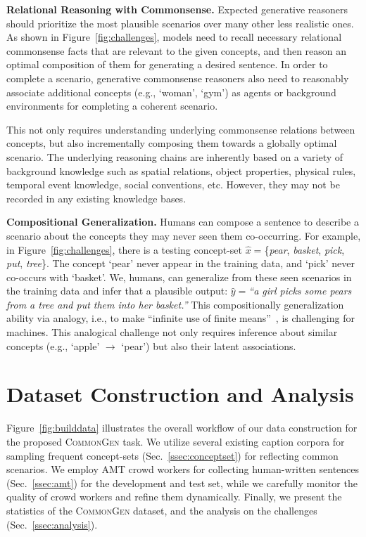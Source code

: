 \documentclass[11pt,a4paper]{article}
\begin{document}
	\smallskip
	\noindent
	\textbf{Relational Reasoning with Commonsense.}
	Expected generative reasoners should prioritize the most plausible scenarios over many other less realistic ones.
	As shown in Figure~\ref{fig:challenges},
	models need to recall necessary relational commonsense facts that are relevant to the given concepts, and then reason an optimal composition of them for generating a desired sentence.
In order to complete a scenario,  generative commonsense reasoners also need to reasonably associate additional concepts (e.g., `woman',  `gym') as agents or background environments for completing a coherent scenario. 


	This not only requires understanding underlying commonsense relations between concepts, 
	but also incrementally composing them towards a globally optimal scenario.
	The underlying reasoning chains are  
	inherently based on a variety of background knowledge such as spatial relations,  object properties, physical rules, temporal event knowledge, social conventions, etc. 
	However, they may not be recorded in any existing knowledge bases.




	
	\smallskip
	\noindent
	\textbf{Compositional Generalization.}
Humans can compose a sentence to describe a scenario about the concepts they may never seen them co-occurring.
	For example, in Figure~\ref{fig:challenges}, there is a testing concept-set $\hat{x}=$\{\textit{pear}, \textit{basket}, \textit{pick}, \textit{put}, \textit{tree}\}.
	The concept `pear' never appear in the training data, and `pick' never co-occurs with `basket'. 
We, humans, can generalize from these seen scenarios in the training data and infer that a plausible output: $\hat{y}=$\textit{``a girl picks some pears from a tree and put them into her basket.''} 
This compositionally generalization ability via analogy, i.e., to make ``infinite use of finite means''~\cite{chomsky1965aspects}, is challenging for machines.
This analogical challenge not only requires inference about similar concepts (e.g., `apple' $\rightarrow$ `pear') but also their latent associations.



	 	
	\section{Dataset Construction and Analysis}
	\label{sec:dataset}
Figure~\ref{fig:builddata}
illustrates the overall workflow of our data construction for the proposed \textsc{CommonGen} task.	
We utilize several existing caption corpora for sampling frequent concept-sets (Sec.~\ref{ssec:conceptset}) for reflecting common scenarios.
	We employ AMT crowd workers for collecting human-written sentences (Sec.~\ref{ssec:amt}) for the development and test set, while we carefully monitor the quality of crowd workers and refine them dynamically.
	Finally, we present the statistics of the \textsc{CommonGen} dataset, and the analysis on the challenges  (Sec.~\ref{ssec:analysis}).
	
\end{document}
